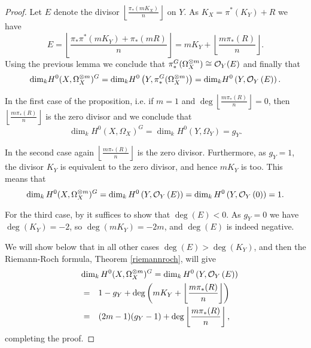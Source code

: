 \documentclass[draft, 11pt]{article} %
\theoremstyle{plain}
\theoremstyle{remark}
\newcommand{\cO}{{\cal O}}
\begin{document}
  \begin{proof}

    Let $E$ denote the divisor $\left\lfloor \frac{\pi_*(mK_X)}{n} \right\rfloor$ on $Y$. As $K_X=\pi^*(K_Y)+R$ we have
      \[ E = 
      \left \lfloor \frac{\pi_*\pi^*(mK_Y) + \pi_*(mR)}{n} \right \rfloor =
      mK_Y + \left \lfloor \frac{m\pi_*(R)}{n} \right \rfloor.\]
    Using the previous lemma we conclude that $\pi_*^G(\Omega_X^{\otimes m}) \cong \cO_Y (E)$ and finally that
      \begin{equation*}
	\textrm{dim}_k H^0(X,\Omega_X^{\otimes m})^G 
	 = \textrm{dim}_k H^0\left(Y, \pi_*^G(\Omega_X^{\otimes m})\right)
	  = \textrm{dim}_k H^0\left(Y, \cO_Y\left( E \right) \right).
      \end{equation*}


  In the first case of the proposition, i.e. if $m=1$ and $\deg \left\lfloor\frac{m\pi_*(R)}{n} \right\rfloor=0$, then $\left\lfloor\frac{m\pi_*(R)}{n} \right\rfloor$ is the zero divisor and we conclude that 
    \begin{equation*}
	\dim_kH^0(X,\Omega_X)^G = \dim_kH^0(Y, \Omega_Y) = g_Y.
    \end{equation*}


  In the second case again $\left\lfloor \frac{m\pi_*(R)}{n} \right\rfloor$ is the zero divisor. 
  Furthermore, as $g_Y=1$, the divisor $K_Y$ is equivalent to the zero divisor, and hence $mK_Y$ is too. 
  This means that
    \begin{equation*}
      \dim_kH^0(X,\Omega_X^{\otimes m})^G = \dim_kH^0\left( Y,\cO_Y\left( E \right) \right) 
      = \dim_k  H^0\left( Y,\cO_Y\left( 0 \right) \right)
      = 1.
    \end{equation*}


  For the third case, by \cite[Ex. 1.3.4, Ch IV]{hart} it suffices to show that $\deg \left( E \right) < 0$.
  As $g_Y=0$ we have $\deg(K_Y)=-2$, so $\deg(mK_Y)=-2m$, and $\deg \left( E \right)$ is indeed negative.



  We will show below that in all other cases $\deg(E) > \deg(K_Y)$, and then the Riemann-Roch formula, Theorem \ref{riemannroch}, will give 
     \begin{eqnarray*}
	\lefteqn{\dim_kH^0(X,\Omega_X^{\otimes m})^G = \dim_kH^0\left(Y,\cO_Y\left( E \right)\right)} \\
	& = & 1-g_Y+\deg\left(mK_Y+\left\lfloor{\frac{m\pi_*(R)}{n}}\right\rfloor\right) \\
	& = & (2m-1)(g_Y-1)+\deg\left\lfloor{\frac{m\pi_*(R)}{n}}\right\rfloor,
      \end{eqnarray*}
  completing the proof.



\end{proof}
\end{document}
